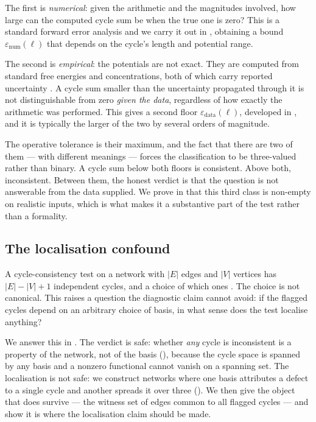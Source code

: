 \documentclass[11pt,twocolumn,a4paper]{article}
\theoremstyle{pstyle}
\theoremstyle{definition}
\theoremstyle{remark}
\newcommand{\abs}[1]{\lvert#1\rvert}
\newcommand{\eps}{\varepsilon}
\newcommand{\epsnum}{\eps_{\mathrm{num}}}
\newcommand{\epsdata}{\eps_{\mathrm{data}}}
\begin{document}
The first is \emph{numerical}: given the arithmetic and the magnitudes
involved, how large can the computed cycle sum be when the true one is
zero? This is a standard forward error analysis \citep{higham2002} and
we carry it out in , obtaining a bound
$\epsnum(\ell)$ that depends on the cycle's length and potential range.

The second is \emph{empirical}: the potentials are not exact. They are
computed from standard free energies and concentrations, both of which
carry reported uncertainty \citep{alberty1998,noor2013,flamholz2012}. A
cycle sum smaller than the uncertainty propagated through it is not
distinguishable from zero \emph{given the data}, regardless of how
exactly the arithmetic was performed. This gives a second floor
$\epsdata(\ell)$, developed in , and it is
typically the larger of the two by several orders of magnitude.

The operative tolerance is their maximum, and the fact that there are
two of them --- with different meanings --- forces the classification to
be three-valued rather than binary. A cycle sum below both floors is
consistent. Above both, inconsistent. Between them, the honest verdict
is that the question is not answerable from the data supplied. We prove
in  that this third class is non-empty on realistic
inputs, which is what makes it a substantive part of the test rather
than a formality.

\subsection{The localisation confound}

A cycle-consistency test on a network with $\abs{E}$ edges and
$\abs{V}$ vertices has $\abs{E}-\abs{V}+1$ independent cycles, and a
choice of which ones \citep{kavitha2009,diestel2017}. The choice is not
canonical. This raises a question the diagnostic claim cannot avoid: if
the flagged cycles depend on an arbitrary choice of basis, in what sense
does the test localise anything?

We answer this in . The verdict is safe: whether
\emph{any} cycle is inconsistent is a property of the network, not of
the basis (), because the cycle space is spanned
by any basis and a nonzero functional cannot vanish on a spanning set.
The localisation is not safe: we construct networks where one basis
attributes a defect to a single cycle and another spreads it over
three (). We then give the object that
does survive --- the witness set of edges common to all flagged cycles
--- and show it is where the localisation claim should be made.
\end{document}
